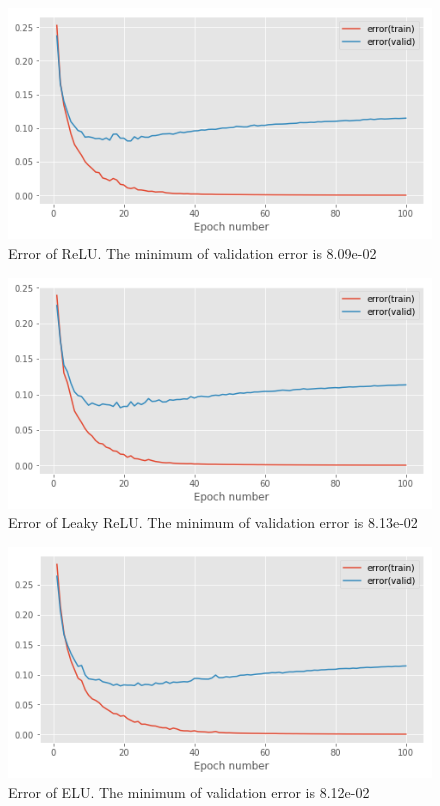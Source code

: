 \documentclass{article}
\begin{document}
\begin{figure}[tb]
\vskip 5mm
\begin{center}
\centerline{\includegraphics[width=\columnwidth]{relu2e.png}}
\caption{Error of ReLU. The minimum of validation error is 8.09e-02}
\label{fig:sample-graph}
\end{center}
\vskip -5mm
\end{figure}
\begin{figure}[htb]
\vskip 5mm
\begin{center}
\centerline{\includegraphics[width=\columnwidth]{lrelu2e.png}}
\caption{Error of Leaky ReLU. The minimum of validation error is 8.13e-02}
\label{fig:sample-graph}
\end{center}
\vskip -5mm
\end{figure}
\begin{figure}[tb]
\vskip 5mm
\begin{center}
\centerline{\includegraphics[width=\columnwidth]{elu2e.png}}
\caption{Error of ELU. The minimum of validation error is 8.12e-02}
\label{fig:sample-graph}
\end{center}
\vskip -5mm
\end{figure}
\end{document}
